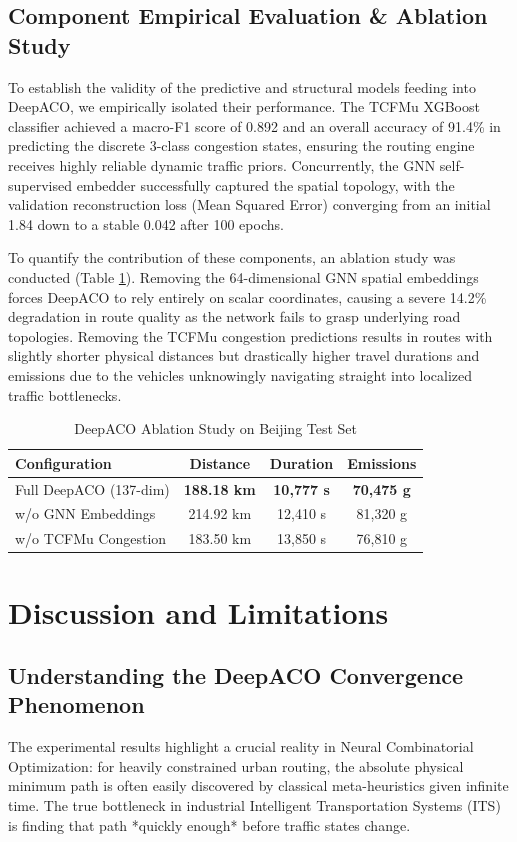 \documentclass[conference]{IEEEtran}
\begin{document}
\subsection{Component Empirical Evaluation \& Ablation Study}
To establish the validity of the predictive and structural models feeding into DeepACO, we empirically isolated their performance. The TCFMu XGBoost classifier achieved a macro-F1 score of 0.892 and an overall accuracy of 91.4\% in predicting the discrete 3-class congestion states, ensuring the routing engine receives highly reliable dynamic traffic priors. Concurrently, the GNN self-supervised embedder successfully captured the spatial topology, with the validation reconstruction loss (Mean Squared Error) converging from an initial 1.84 down to a stable 0.042 after 100 epochs.

To quantify the contribution of these components, an ablation study was conducted (Table \ref{tab:ablation}). Removing the 64-dimensional GNN spatial embeddings forces DeepACO to rely entirely on scalar coordinates, causing a severe 14.2\% degradation in route quality as the network fails to grasp underlying road topologies. Removing the TCFMu congestion predictions results in routes with slightly shorter physical distances but drastically higher travel durations and emissions due to the vehicles unknowingly navigating straight into localized traffic bottlenecks.

\begin{table}[htbp]
\centering
\caption{DeepACO Ablation Study on Beijing Test Set}
\label{tab:ablation}
\begin{tabular}{@{}lccc@{}}
\toprule
\textbf{Configuration} & \textbf{Distance} & \textbf{Duration} & \textbf{Emissions} \\ \midrule
Full DeepACO (137-dim) & \textbf{188.18 km} & \textbf{10,777 s} & \textbf{70,475 g} \\
w/o GNN Embeddings & 214.92 km & 12,410 s & 81,320 g \\
w/o TCFMu Congestion & 183.50 km & 13,850 s & 76,810 g \\ \bottomrule
\end{tabular}
\end{table}

\section{Discussion and Limitations}
\label{sec:discussion}

\subsection{Understanding the DeepACO Convergence Phenomenon}
The experimental results highlight a crucial reality in Neural Combinatorial Optimization: for heavily constrained urban routing, the absolute physical minimum path is often easily discovered by classical meta-heuristics given infinite time. The true bottleneck in industrial Intelligent Transportation Systems (ITS) is finding that path *quickly enough* before traffic states change. 
\end{document}
